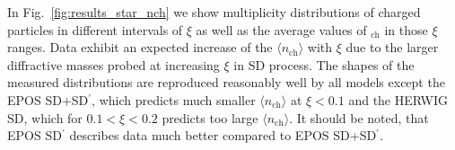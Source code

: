 In Fig.~\ref{fig:results_star_nch} we show multiplicity distributions of charged particles in different intervals of $\xi$ as well as the average values of $_\textrm{ch}$ in those $\xi$ ranges. 
Data exhibit an expected increase of the $\langle n_\textrm{ch}\rangle$ with $\xi$ due to the larger diffractive masses probed at increasing $\xi$ in SD process. The shapes of the measured distributions are reproduced reasonably well by all models except the EPOS SD+SD$^\prime$, which predicts much smaller $\langle n_\textrm{ch}\rangle$ at $\xi<0.1$ and the HERWIG SD, which for $0.1<\xi<0.2$ predicts too large $\langle n_\textrm{ch}\rangle$.
It should be noted, that EPOS SD$^\prime$ describes data much better compared to EPOS SD+SD$^\prime$.

